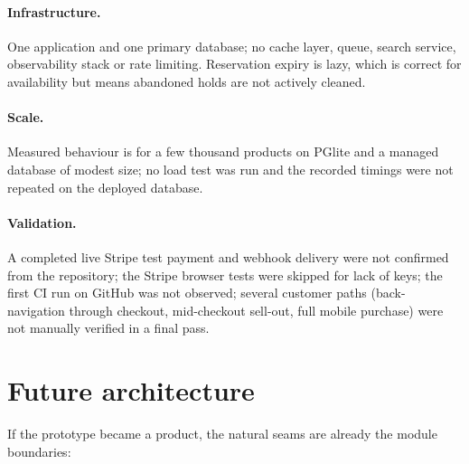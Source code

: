 \paragraph{Infrastructure.} One application and one primary database; no cache layer, queue, search service, observability stack or rate limiting. Reservation expiry is lazy, which is correct for availability but means abandoned holds are not actively cleaned.

\paragraph{Scale.} Measured behaviour is for a few thousand products on PGlite and a managed database of modest size; no load test was run and the recorded timings were not repeated on the deployed database.

\paragraph{Validation.} A completed live Stripe test payment and webhook delivery were not confirmed from the repository; the Stripe browser tests were skipped for lack of keys; the first CI run on GitHub was not observed; several customer paths (back-navigation through checkout, mid-checkout sell-out, full mobile purchase) were not manually verified in a final pass.

\section{Future architecture}\label{sec:future}


If the prototype became a product, the natural seams are already the module boundaries:

